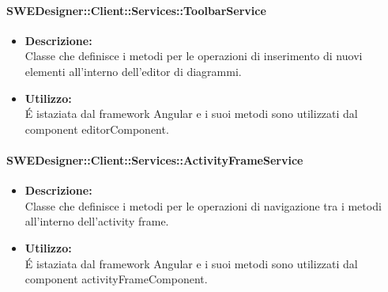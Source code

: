           	\paragraph{SWEDesigner::Client::Services::ToolbarService}
				\begin{itemize}
          			\item \textbf{Descrizione:}\\
          			Classe che definisce i metodi per le operazioni di inserimento di nuovi elementi all’interno dell’editor di diagrammi.
          			\item \textbf{Utilizzo:}\\
          			É istaziata dal framework Angular e i suoi metodi sono utilizzati dal component editorComponent.
          		\end{itemize}
          	\paragraph{SWEDesigner::Client::Services::ActivityFrameService}
				\begin{itemize}
          			\item \textbf{Descrizione:}\\
          			Classe che definisce i metodi per le operazioni di navigazione tra i metodi all’interno dell’activity frame.
          			\item \textbf{Utilizzo:}\\
          			É istaziata dal framework Angular e i suoi metodi sono utilizzati dal component activityFrameComponent.
          		\end{itemize}
